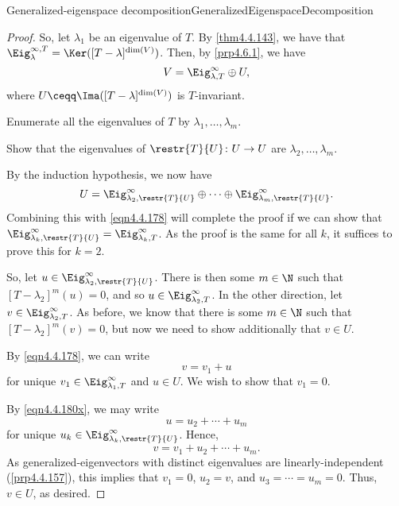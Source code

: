 \begin{thm}{Generalized-eigenspace decomposition\hfill}{GeneralizedEigenspaceDecomposition}
\begin{proof}
		So, let $\lambda _1$ be an eigenvalue of $T$.  By \cref{thm4.4.143}, we have that $\Eig _{\lambda}^{\infty ,T}=\Ker ([T-\lambda ]^{\dim (V)})$.  Then, by \cref{prp4.6.1}, we have
		\begin{equation}\label{eqn4.4.178}
			V=\Eig _{\lambda ,T}^{\infty}\oplus U,
		\end{equation}
		where $U\ceqq \Ima ([T-\lambda ]^{\dim (V)})$ is $T$-invariant.
	
		Enumerate all the eigenvalues of $T$ by $\lambda _1,\ldots ,\lambda _m$.
		\begin{exr}[breakable=false]{}{}
			Show that the eigenvalues of $\restr{T}{U}\colon U\rightarrow U$ are $\lambda _2,\ldots ,\lambda _m$.
		\end{exr}
		By the induction hypothesis, we now have
		\begin{equation}\label{eqn4.4.180x}
			U=\Eig _{\lambda _2,\restr{T}{U}}^{\infty}\oplus \cdots \oplus \Eig _{\lambda _m,\restr{T}{U}}^{\infty}.
		\end{equation}
		Combining this with \eqref{eqn4.4.178} will complete the proof if we can show that $\Eig _{\lambda _k,\restr{T}{U}}^{\infty}=\Eig _{\lambda _k,T}^{\infty}$.  As the proof is the same for all $k$, it suffices to prove this for $k=2$.
	
		So, let $u\in \Eig _{\lambda _2,\restr{T}{U}}^{\infty}$.  There is then some $m\in \N$ such that $[T-\lambda _2]^m(u)=0$, and so $u\in \Eig _{\lambda _2,T}^{\infty}$.  In the other direction, let $v\in \Eig _{\lambda _2,T}^{\infty}$.  As before, we know that there is some $m\in \N$ such that $[T-\lambda _2]^m(v)=0$, but now we need to show additionally that $v\in U$.
	
		By \eqref{eqn4.4.178}, we can write
		\begin{equation}\label{eqn4.4.181}
			v=v_1+u
		\end{equation}
		for unique $v_1\in \Eig _{\lambda _1,T}^{\infty}$ and $u\in U$.  We wish to show that $v_1=0$.
	
		By \eqref{eqn4.4.180x}, we may write
		\begin{equation}
			u=u_2+\cdots +u_m
		\end{equation} 
		for unique $u_k\in \Eig _{\lambda _k,\restr{T}{U}}^{\infty}$.  Hence,
		\begin{equation}
			v=v_1+u_2+\cdots +u_m.
		\end{equation}
		As generalized-eigenvectors with distinct eigenvalues are linearly-independent (\cref{prp4.4.157}), this implies that $v_1=0$, $u_2=v$, and $u_3=\cdots =u_m=0$.  Thus, $v\in U$, as desired.
	\end{proof}
\end{thm}